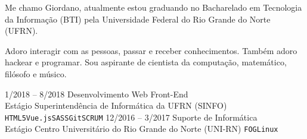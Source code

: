 \documentclass[9pt]{developercv} %
\begin{document}
\vspace{0.5cm}



\begin{minipage}[t]{0.4\textwidth} %
    \vspace{-\baselineskip} %
    
    Me chamo Giordano, atualmente estou graduando no Bacharelado em Tecnologia da Informação (BTI) pela Universidade Federal do Rio Grande do Norte (UFRN).
    
    Adoro interagir com as pessoas, passar e receber conhecimentos. Também adoro hackear e programar. Sou aspirante de cientista da computação, matemático, filósofo e músico.\\
\end{minipage}
\hfill %
\begin{minipage}[t]{0.5\textwidth} %
    \vspace{-\baselineskip} %
    \begin{barchart}{5.5}
    \end{barchart}
\end{minipage}




\begin{entrylist}
    \entry
        {1/2018 -- 8/2018}
        {Desenvolvimento Web Front-End\\
            \footnotesize{Estágio}}
        {Superintendência de Informática da UFRN (SINFO)}
        {\texttt{HTML5}\slashsep\texttt{Vue.js}\slashsep\texttt{SASS}\slashsep\texttt{Git}\slashsep\texttt{SCRUM}}
    \entry
        {12/2016 -- 3/2017}
        {Suporte de Informática\\
            \footnotesize{Estágio}}
        {Centro Universitário do Rio Grande do Norte (UNI-RN)}
        {\texttt{FOG}\slashsep\texttt{Linux}}
\end{entrylist}
\end{document}
